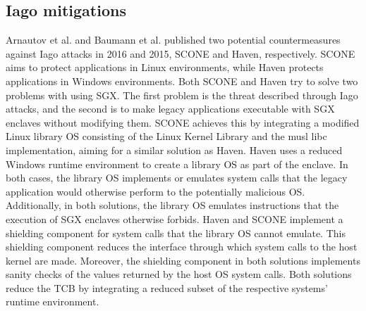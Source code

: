 \subsection{Iago mitigations}
Arnautov et al. and Baumann et al. published two potential countermeasures
against Iago attacks in 2016 and 2015, SCONE and Haven, respectively. SCONE aims
to protect applications in Linux environments, while Haven protects applications
in Windows environments.\cite{arnautov_scone_2016, baumann_shielding_2015} Both
SCONE and Haven try to solve two problems with using SGX. The first problem is
the threat described through Iago attacks, and the second is to make legacy
applications executable with SGX enclaves without modifying them. SCONE achieves
this by integrating a modified Linux library OS consisting of the Linux Kernel
Library and the musl libc implementation, aiming for a similar solution as
Haven. Haven uses a reduced Windows runtime environment to create a library OS
as part of the enclave. In both cases, the library OS implements or emulates
system calls that the legacy application would otherwise perform to the
potentially malicious OS. Additionally, in both solutions, the library OS
emulates instructions that the execution of SGX enclaves otherwise forbids.
Haven and SCONE implement a shielding component for system calls that the
library OS cannot emulate. This shielding component reduces the interface
through which system calls to the host kernel are made. Moreover, the shielding
component in both solutions implements sanity checks of the values returned by
the host OS system calls. Both solutions reduce the TCB by integrating a reduced
subset of the respective systems' runtime environment.

